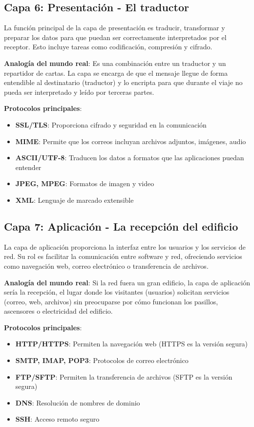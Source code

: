 \subsection{Capa 6: Presentación - El traductor}

La función principal de la capa de presentación es traducir, transformar y preparar los datos para que puedan ser correctamente interpretados por el receptor. Esto incluye tareas como codificación, compresión y cifrado.

\textbf{Analogía del mundo real}: Es una combinación entre un traductor y un repartidor de cartas. La capa se encarga de que el mensaje llegue de forma entendible al destinatario (traductor) y lo encripta para que durante el viaje no pueda ser interpretado y leído por terceras partes.

\textbf{Protocolos principales}:
\begin{itemize}
    \item \textbf{SSL/TLS}: Proporciona cifrado y seguridad en la comunicación
    \item \textbf{MIME}: Permite que los correos incluyan archivos adjuntos, imágenes, audio
    \item \textbf{ASCII/UTF-8}: Traducen los datos a formatos que las aplicaciones puedan entender
    \item \textbf{JPEG, MPEG}: Formatos de imagen y video
    \item \textbf{XML}: Lenguaje de marcado extensible
\end{itemize}

\subsection{Capa 7: Aplicación - La recepción del edificio}

La capa de aplicación proporciona la interfaz entre los usuarios y los servicios de red. Su rol es facilitar la comunicación entre software y red, ofreciendo servicios como navegación web, correo electrónico o transferencia de archivos.

\textbf{Analogía del mundo real}: Si la red fuera un gran edificio, la capa de aplicación sería la recepción, el lugar donde los visitantes (usuarios) solicitan servicios (correo, web, archivos) sin preocuparse por cómo funcionan los pasillos, ascensores o electricidad del edificio.

\textbf{Protocolos principales}:
\begin{itemize}
    \item \textbf{HTTP/HTTPS}: Permiten la navegación web (HTTPS es la versión segura)
    \item \textbf{SMTP, IMAP, POP3}: Protocolos de correo electrónico
    \item \textbf{FTP/SFTP}: Permiten la transferencia de archivos (SFTP es la versión segura)
    \item \textbf{DNS}: Resolución de nombres de dominio
    \item \textbf{SSH}: Acceso remoto seguro
\end{itemize}

